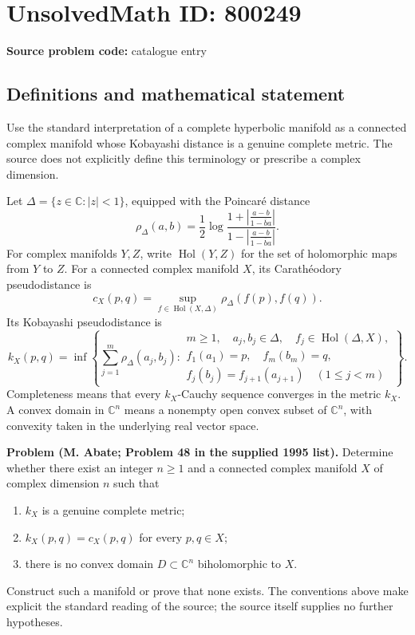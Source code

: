 \documentclass[11pt]{article}
\newcommand{\C}{\mathbb{C}}
\begin{document}
\section*{UnsolvedMath ID: 800249}
\textbf{Source problem code:} catalogue entry
\subsection{Definitions and mathematical statement}
Use the standard interpretation of a complete hyperbolic manifold as a connected complex manifold whose Kobayashi distance is a genuine complete metric. The source does not explicitly define this terminology or prescribe a complex dimension.

Let \(\Delta=\{z\in\C:|z|<1\}\), equipped with the Poincar\'e distance
\[
\rho_\Delta(a,b)=\frac12\log\frac{1+\left|\frac{a-b}{1-\overline b a}\right|}{1-\left|\frac{a-b}{1-\overline b a}\right|}.
\]
For complex manifolds \(Y,Z\), write \(\operatorname{Hol}(Y,Z)\) for the set of holomorphic maps from \(Y\) to \(Z\). For a connected complex manifold \(X\), its Carath\'eodory pseudodistance is
\[
c_X(p,q)=\sup_{f\in\operatorname{Hol}(X,\Delta)}\rho_\Delta(f(p),f(q)).
\]
Its Kobayashi pseudodistance is
\[
k_X(p,q)=\inf\left\{\sum_{j=1}^{m}\rho_\Delta(a_j,b_j):
\begin{array}{l}
m\geq1,\quad a_j,b_j\in\Delta,\quad f_j\in\operatorname{Hol}(\Delta,X),\\
f_1(a_1)=p,\quad f_m(b_m)=q,\\
f_j(b_j)=f_{j+1}(a_{j+1})\quad(1\leq j<m)
\end{array}\right\}.
\]
Completeness means that every \(k_X\)-Cauchy sequence converges in the metric \(k_X\). A convex domain in \(\C^n\) means a nonempty open convex subset of \(\C^n\), with convexity taken in the underlying real vector space.

\textbf{Problem (M. Abate; Problem 48 in the supplied 1995 list).} Determine whether there exist an integer \(n\geq1\) and a connected complex manifold \(X\) of complex dimension \(n\) such that
\begin{enumerate}
\item \(k_X\) is a genuine complete metric;
\item \(k_X(p,q)=c_X(p,q)\) for every \(p,q\in X\);
\item there is no convex domain \(D\subset\C^n\) biholomorphic to \(X\).
\end{enumerate}
Construct such a manifold or prove that none exists. The conventions above make explicit the standard reading of the source; the source itself supplies no further hypotheses.
\end{document}
